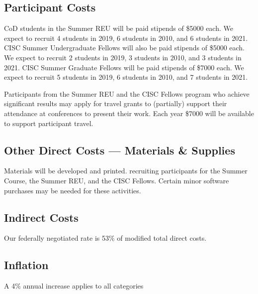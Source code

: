 \documentclass[11pt]{NSFamsart}
\begin{document}
\subsection*{Participant Costs}
CoD students in the Summer REU will be paid stipends of \$5000 each.  We expect to recruit 4 students in 2019, 6 students in 2010, and 6 students in 2021.  CISC Summer Undergraduate Fellows will also be paid stipends of \$5000 each. We expect to recruit 2 students in 2019, 3 students in 2010, and 3 students in 2021.  CISC Summer Graduate Fellows will be paid stipends of \$7000 each. We expect to recruit 5 students in 2019, 6 students in 2010, and 7 students in 2021. 

Participants from the Summer REU and the CISC Fellows program who achieve significant results may apply for travel grants to (partially) support their attendance at conferences to present their work.  Each year \$7000 will be available to support participant travel.



\subsection*{Other Direct Costs --- Materials \& Supplies}
Materials will be developed and printed. recruiting participants for the Summer Course, the Summer REU, and the CISC Fellows.  Certain minor software purchases may be needed for these activities.

\subsection*{Indirect Costs}
Our federally negotiated rate is 53\% of modified total direct costs.


\subsection*{Inflation}A 4\% annual increase applies to all categories
\end{document}
